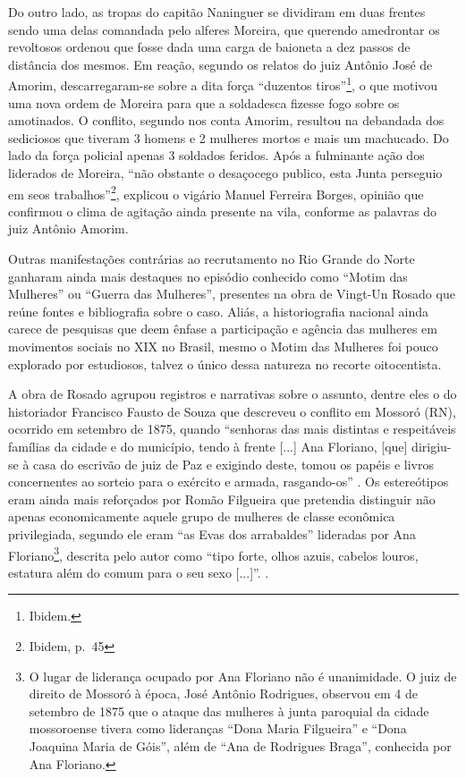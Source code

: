 \begin{refsection}
Do outro lado, as tropas do capitão Naninguer se dividiram em duas frentes sendo uma delas comandada pelo alferes Moreira, que querendo amedrontar os revoltosos ordenou que fosse dada uma carga de baioneta a dez passos de distância dos mesmos. Em reação, segundo os relatos do juiz Antônio José de Amorim, descarregaram-se sobre a dita força “duzentos tiros”\footnote{Ibidem.}, o que motivou uma nova ordem de Moreira para que a soldadesca fizesse fogo sobre os amotinados. O conflito, segundo nos conta Amorim, resultou na debandada dos sediciosos que tiveram 3 homens e 2 mulheres mortos e mais um machucado. Do lado da força policial apenas 3 soldados feridos. Após a fulminante ação dos liderados de Moreira, “não obstante o desaçocego publico, esta Junta perseguio em seos trabalhos”\footnote{Ibidem, p.~45}, explicou o vigário Manuel Ferreira Borges, opinião que confirmou o clima de agitação ainda presente na vila, conforme as palavras do juiz Antônio Amorim. 

Outras manifestações contrárias ao recrutamento no Rio Grande do Norte ganharam ainda mais destaques no episódio conhecido como “Motim das Mulheres” ou “Guerra das Mulheres”, presentes na obra de Vingt-Un Rosado que reúne fontes e bibliografia sobre o caso. Aliás, a historiografia nacional ainda carece de pesquisas que deem ênfase a participação e agência das mulheres em movimentos sociais no XIX no Brasil, mesmo o Motim das Mulheres foi pouco explorado por estudiosos, talvez o único dessa natureza no recorte oitocentista.  

A obra de Rosado agrupou registros e narrativas sobre o assunto, dentre eles o do historiador Francisco Fausto de Souza que descreveu o conflito em Mossoró (RN), ocorrido em setembro de 1875, quando “senhoras das mais distintas e respeitáveis famílias da cidade e do município, tendo à frente [...] Ana Floriano, [que] dirigiu-se à casa do escrivão de juiz de Paz e exigindo deste, tomou os papéis e livros concernentes ao sorteio para o exército e armada, rasgando-os” \cite[p.~2]{Rosado1981}. Os estereótipos eram ainda mais reforçados por Romão Filgueira que pretendia distinguir não apenas economicamente aquele grupo de mulheres de classe econômica privilegiada, segundo ele eram “as Evas dos arrabaldes” lideradas por Ana Floriano\footnote{O lugar de liderança ocupado por Ana Floriano não é unanimidade. O juiz de direito de Mossoró à época, José Antônio Rodrigues, observou em 4 de setembro de 1875 que o ataque das mulheres à junta paroquial da cidade mossoroense tivera como lideranças “Dona Maria Filgueira” e “Dona Joaquina Maria de Góis”, além de “Ana de Rodrigues Braga”, conhecida por Ana Floriano.}, descrita pelo autor como “tipo forte, olhos azuis, cabelos louros, estatura além do comum para o seu sexo [...]”. \cite[p.~3]{Rosado1981}.


\end{refsection}
